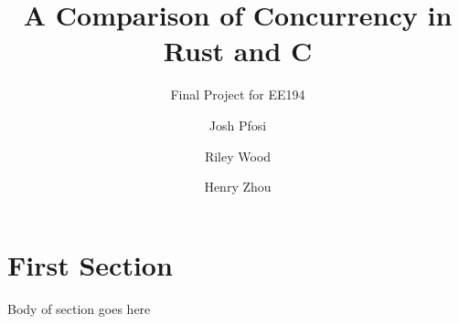 \documentclass{scrartcl}
\title{A Comparison of Concurrency in Rust and C}
\subtitle{Final Project for EE194}
\author{
    Josh Pfosi\\
    \and
    Riley Wood\\
    \and
    Henry Zhou\\
}
\begin{document}
\maketitle


\section*{First Section}
Body of section goes here




\end{document}
